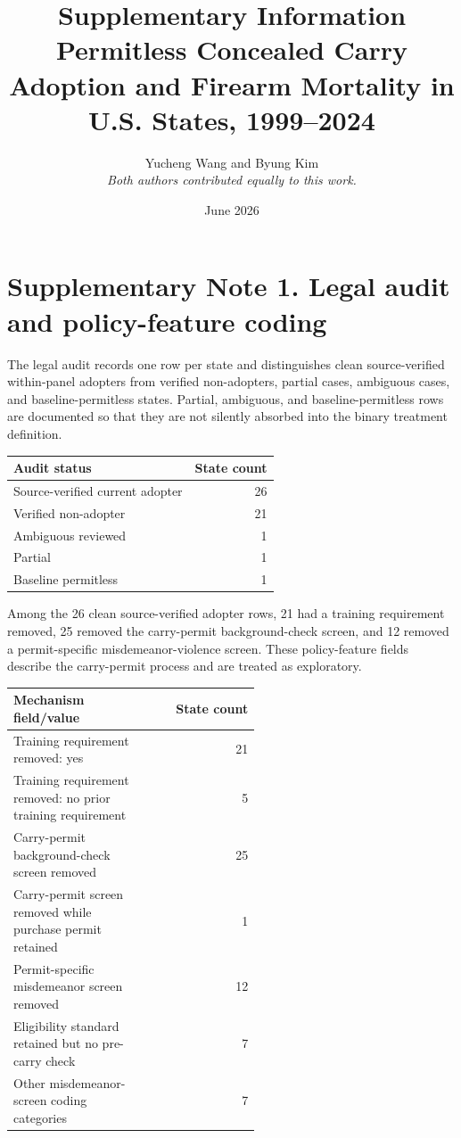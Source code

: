 \documentclass[10pt]{article}
\title{\bfseries Supplementary Information\\Permitless Concealed Carry Adoption and Firearm Mortality in U.S. States, 1999--2024}
\author{Yucheng Wang and Byung Kim\\\textit{Both authors contributed equally to this work.}}
\date{June 2026}
\begin{document}
\maketitle

\section*{Supplementary Note 1. Legal audit and policy-feature coding}

The legal audit records one row per state and distinguishes clean source-verified within-panel adopters from verified non-adopters, partial cases, ambiguous cases, and baseline-permitless states. Partial, ambiguous, and baseline-permitless rows are documented so that they are not silently absorbed into the binary treatment definition.

\begin{center}
\begin{tabular}{lr}
\toprule
Audit status & State count \\
\midrule
Source-verified current adopter & 26 \\
Verified non-adopter & 21 \\
Ambiguous reviewed & 1 \\
Partial & 1 \\
Baseline permitless & 1 \\
\bottomrule
\end{tabular}
\end{center}

Among the 26 clean source-verified adopter rows, 21 had a training requirement removed, 25 removed the carry-permit background-check screen, and 12 removed a permit-specific misdemeanor-violence screen. These policy-feature fields describe the carry-permit process and are treated as exploratory.

\begin{center}
\begin{tabular}{p{0.55\linewidth}r}
\toprule
Mechanism field/value & State count \\
\midrule
Training requirement removed: yes & 21 \\
Training requirement removed: no prior training requirement & 5 \\
Carry-permit background-check screen removed & 25 \\
Carry-permit screen removed while purchase permit retained & 1 \\
Permit-specific misdemeanor screen removed & 12 \\
Eligibility standard retained but no pre-carry check & 7 \\
Other misdemeanor-screen coding categories & 7 \\
\bottomrule
\end{tabular}
\end{center}
\end{document}
